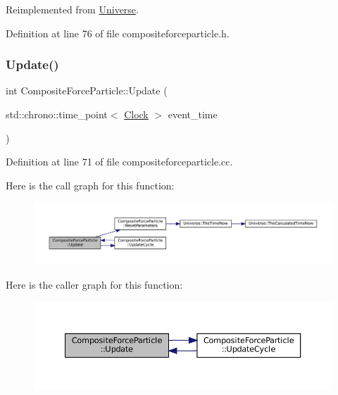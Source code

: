Reimplemented from \mbox{\hyperlink{class_universe_a2d3d642bfdc863248e93535832fa4b00}{Universe}}.



Definition at line 76 of file compositeforceparticle.\+h.

\mbox{\label{class_composite_force_particle_a69b47aaf17ab6faa396c2f6e6c85b2e3}} 
\subsubsection{\texorpdfstring{Update()}{Update()}}
{\footnotesize\ttfamily int Composite\+Force\+Particle\+::\+Update (\begin{DoxyParamCaption}\item[{std\+::chrono\+::time\+\_\+point$<$ \mbox{\hyperlink{universe_8h_a0ef8d951d1ca5ab3cfaf7ab4c7a6fd80}{Clock}} $>$}]{event\+\_\+time }\end{DoxyParamCaption})}



Definition at line 71 of file compositeforceparticle.\+cc.

Here is the call graph for this function\+:\nopagebreak
\begin{figure}[H]
\begin{center}
\leavevmode
\includegraphics[width=350pt]{class_composite_force_particle_a69b47aaf17ab6faa396c2f6e6c85b2e3_cgraph}
\end{center}
\end{figure}
Here is the caller graph for this function\+:\nopagebreak
\begin{figure}[H]
\begin{center}
\leavevmode
\includegraphics[width=350pt]{class_composite_force_particle_a69b47aaf17ab6faa396c2f6e6c85b2e3_icgraph}
\end{center}
\end{figure}
\mbox{\label{class_composite_force_particle_a578d87e48246ef83f39dce070dff541e}} 
